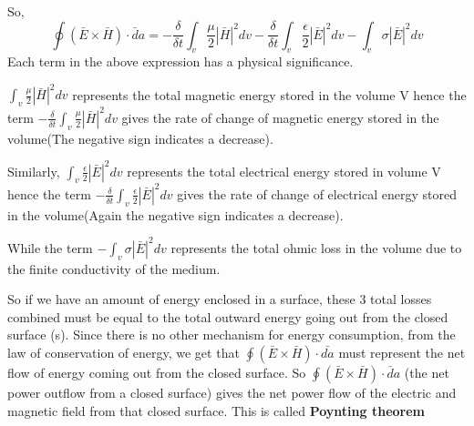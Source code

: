 So,
\begin{dmath}
\oint(\bar{E}\times\bar{H})\cdot\bar{d}a = -  \frac{\delta}{\delta t}\int_{v} \frac{\mu}{2}|\bar{H}|^{2}dv -  \frac{\delta}{\delta t}\int_{v}\frac{\epsilon}{2}|\bar{E}|^{2}dv
- \int_{v}\sigma|\bar{E}|^{2}dv 
\end{dmath}
Each term in the above expression has a physical significance.

$\int_{v} \frac{\mu}{2}|\bar{H}|^{2}dv$ represents the total magnetic energy stored in the volume V hence the term $-\frac{\delta}{\delta t}\int_{v} \frac{\mu}{2}|\bar{H}|^{2}dv$ gives the rate of change of magnetic energy stored in the volume(The negative sign indicates a decrease).

Similarly, $\int_{v}\frac{\epsilon}{2}|\bar{E}|^{2}dv$ represents the total electrical energy stored in volume V hence the term $-\frac{\delta}{\delta t}\int_{v}\frac{\epsilon}{2}|\bar{E}|^{2}dv$ gives the rate of change of electrical energy stored in the volume(Again the negative sign indicates a decrease).

While the term $-\int_{v}\sigma|\bar{E}|^{2}dv $ represents the total ohmic loss in the volume due to the finite conductivity of the medium.

So if we have an amount of energy enclosed in a surface, these 3 total losses combined must be equal to the total outward energy going out from the closed surface (s). Since there is no other mechanism for energy consumption, from the law of conservation of energy, we get that $ \oint(\bar{E}\times\bar{H})\cdot\bar{da} $ must represent the net flow of energy coming out from the closed surface. So $ \oint(\bar{E}\times\bar{H})\cdot\bar{d}a $ (the net power outflow from a closed surface)  gives the net power flow of the electric and magnetic field from that closed surface. This is called \textbf{Poynting theorem}

